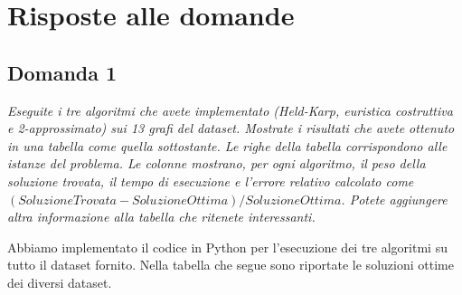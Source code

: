 \section{Risposte alle domande}

\subsection{Domanda 1}

\textit{Eseguite i tre algoritmi che avete implementato (Held-Karp, euristica costruttiva e 2-approssimato) sui 13 grafi
del dataset. Mostrate i risultati che avete ottenuto in una tabella come quella sottostante. Le righe della tabella
corrispondono alle istanze del problema. Le colonne mostrano, per ogni algoritmo, il peso della soluzione trovata, il
tempo di esecuzione e l'errore relativo calcolato come $(SoluzioneTrovata - SoluzioneOttima) / SoluzioneOttima$. Potete
aggiungere altra informazione alla tabella che ritenete interessanti.}

Abbiamo implementato il codice in Python per l'esecuzione dei tre algoritmi su tutto il dataset fornito. Nella tabella che segue sono riportate le soluzioni ottime dei diversi dataset.

